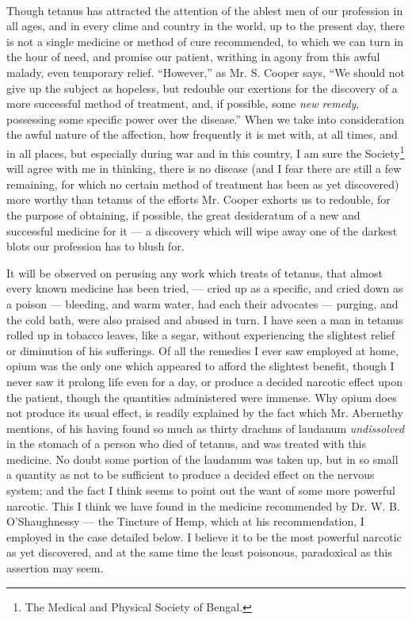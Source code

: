 \documentclass[a4paper, 11pt, oneside, polutonikogreek, english]{article}
\begin{document}
\paragraph{}
Though tetanus has attracted the attention of the ablest men of our profession in all ages, and in every clime and country in the world, up to the present day, there is not a single medicine or method of cure recommended, to which we can turn in the hour of need, and promise our patient, writhing in agony from this awful malady, even temporary relief. ``However,'' as Mr. S. Cooper says, ``We should not give up the subject as hopeless, but redouble our exertions for the discovery of a more successful method of treatment, and, if possible, some \emph{new remedy}, possessing some specific power over the disease.'' When we take into consideration the awful nature of the affection, how frequently it is met with, at all times, and in all places, but especially during war and in this country, I am sure the Society\footnote{The Medical and Physical Society of Bengal.} will agree with me in thinking, there is no disease (and I fear there are still a few remaining, for which no certain method of treatment has been as yet discovered) more worthy than tetanus of the efforts Mr. Cooper exhorts us to redouble, for the purpose of obtaining, if possible, the great desideratum of a new and successful medicine for it --- a discovery which will wipe away one of the darkest blots our profession has to blush for.

It will be observed on perusing any work which treats of tetanus, that almost every known medicine has been tried, --- cried up as a specific, and cried down as a poison --- bleeding, and warm water, had each their advocates --- purging, and the cold bath, were also praised and abused in turn. I have seen a man in tetanus rolled up in tobacco leaves, like a segar, without experiencing the slightest relief or diminution of his sufferings. Of all the remedies I ever saw employed at home, opium was the only one which appeared to afford the slightest benefit, though I never saw it prolong life even for a day, or produce a decided narcotic effect upon the patient, though the quantities administered were immense. Why opium does not produce its usual effect, is readily explained by the fact which Mr. Abernethy mentions, of his having found so much as thirty drachms of laudanum \emph{undissolved} in the stomach of a person who died of tetanus, and was treated with this medicine. No doubt some portion of the laudanum was taken up, but in so small a quantity as not to be sufficient to produce a decided effect on the nervous system; and the fact I think seems to point out the want of some more powerful narcotic. This I think we have found in the medicine recommended by Dr. W. B. O'Shaughnessy --- the Tincture of Hemp, which at his recommendation, I employed in the case detailed below. I believe it to be the most powerful narcotic as yet discovered, and at the same time the least poisonous, paradoxical as this assertion may seem.
\end{document}
